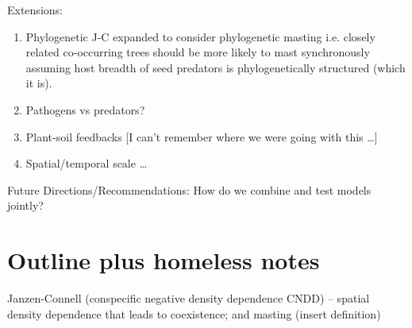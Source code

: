 \documentclass[11pt]{article}
\begin{document}
Extensions:
\begin{enumerate}
    \item Phylogenetic J-C expanded to consider phylogenetic masting i.e. closely related co-occurring trees should be more likely to mast synchronously assuming host breadth of seed predators is phylogenetically structured (which it is).
\item Pathogens vs predators?
\item Plant-soil feedbacks [I can’t remember where we were going with this …]
\item Spatial/temporal scale …
\end{enumerate}
Future Directions/Recommendations:
How do we combine and test models jointly?


\section{Outline plus homeless notes}

Janzen-Connell (conspecific negative density dependence CNDD) -- spatial density dependence that leads to coexistence; and masting (insert definition)
\end{document}
